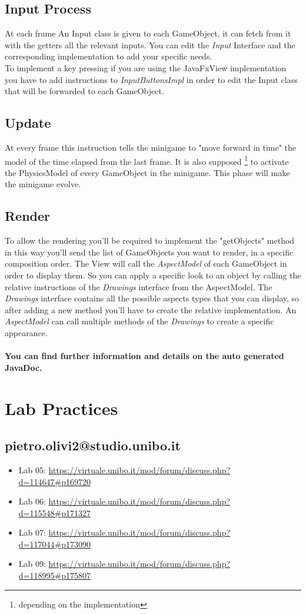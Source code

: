\documentclass[a4paper,12pt]{report}
\begin{document}
\section*{Input Process}
At each frame An Input class is given to each GameObject, it can fetch from it with the getters all the relevant inputs.
You can edit the \textit{Input} Interface and the corresponding implementation to add your specific needs.\\
To implement a key pressing if you are using the JavaFxView implementation you have to add instructions to \textit{InputButtonsImpl} in order to edit the Input class that will be forwarded to each GameObject.

\section*{Update}
At every frame this instruction tells the minigame to "move forward in time" the model of the time elapsed from the last frame. It is also supposed \footnote{depending on the implementation} to activate the PhysicsModel of every GameObject in the minigame.
This phase will make the minigame evolve.
\section*{Render}
To allow the rendering you'll be required to implement the "getObjects" method in this way you'll send the list of GameObjects you want to render, in a specific 
composition order. The View will call the \textit{AspectModel} of each GameObject in order to display them. So you can apply a specific look to an object by calling 
the relative instructions of the \textit{Drawings} interface from the AspectModel. The \textit{Drawings} interface contains all the possible aspects types that you 
can display, so after adding a new method you'll have to create the relative implementation. An \textit{AspectModel} can call multiple methods of the \textit{Drawings} 
to create a specific appearance.
\\\\
\textbf{You can find further information and details on the auto generated JavaDoc.}
\chapter{Lab Practices}
\section*{pietro.olivi2@studio.unibo.it}
\begin{itemize}
	\item Lab 05: \url{https://virtuale.unibo.it/mod/forum/discuss.php?d=114647#p169720}
	\item Lab 06: \url{https://virtuale.unibo.it/mod/forum/discuss.php?d=115548#p171327}
	\item Lab 07: \url{https://virtuale.unibo.it/mod/forum/discuss.php?d=117044#p173090}
	\item Lab 09: \url{https://virtuale.unibo.it/mod/forum/discuss.php?d=118995#p175807}
\end{itemize}
\end{document}
